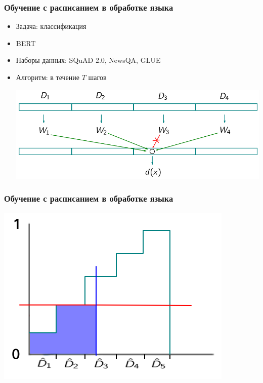 \documentclass{beamer}
\begin{document}
\begin{frame}
	\frametitle{Обучение с расписанием в обработке языка}		\let\thefootnote\relax{}
	\begin{itemize}
		\item Задача: классификация
		\item BERT
		\item Наборы данных: SQuAD 2.0, NewsQA, GLUE
		\item Алгоритм: в течение $T$ шагов
			\begin{center}
				\includegraphics[scale=0.45]{acl20_algo_difficulty}
			\end{center}
	\end{itemize}
\end{frame}

\begin{frame}
	\frametitle{Обучение с расписанием в обработке языка}
	\begin{center}
		\includegraphics[scale=0.6]{acl20_algo_sampler}
	\end{center}
\end{frame}
\end{document}
